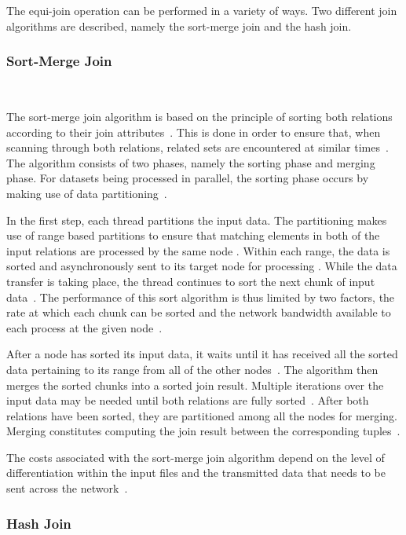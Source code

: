 \documentclass[10pt,twocolumn]{witseiepaper}
\begin{document}
The equi-join operation can be performed in a variety of ways. Two different join algorithms are described, namely the sort-merge join and the hash join.

\subsubsection{Sort-Merge Join}\label{sortmerge}$   $

The sort-merge join algorithm is based on the principle of sorting both relations according to their join attributes~\cite{thomas_zurek_optimisation_1997}. This is done in order to ensure that, when scanning through both relations, related sets are encountered at similar times~\cite{thomas_zurek_optimisation_1997}. The algorithm consists of two phases, namely the sorting phase and merging phase. For datasets being processed in parallel, the sorting phase occurs by making use of data partitioning~\cite{dist}.

In the first step, each thread partitions the input data. The partitioning makes use of range based partitions to ensure that matching elements in both of the input relations are processed by the same node \cite{dist}. Within each range, the data is sorted and asynchronously sent to its target node for processing \cite{dist}. While the data transfer is taking place, the thread continues to sort the next chunk of input data~\cite{dist}. The performance of this sort algorithm is thus limited by two factors, the rate at which each chunk can be sorted and the network bandwidth available to each process at the given node~\cite{dist}.

After a node has sorted its input data, it waits until it has received all the sorted data pertaining to its range from all of the other nodes~\cite{dist}. The algorithm then merges the sorted chunks into a sorted join result. Multiple iterations over the input data may be needed until both relations are fully sorted~\cite{dist}. After both relations have been sorted, they are partitioned among all the nodes for merging. Merging constitutes computing the join result between the corresponding tuples~\cite{dist}.

The costs associated with the sort-merge join algorithm depend on the level of differentiation within the input files and the transmitted data that needs to be sent across the network~\cite{dist}.

\subsubsection{Hash Join}$    $
\end{document}
